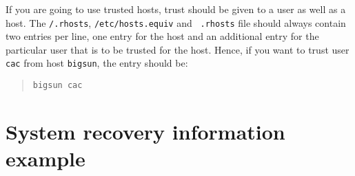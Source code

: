 \documentclass[11pt]{article}
\newcommand{\xlabel}[1]{}
\begin{document}
If you are going to use trusted hosts, trust should be given to a user
as well as a host. The {\tt /.rhosts}, {\tt /etc/hosts.equiv} and {\tt
.rhosts} file should always contain two entries per line, one entry for
the host and an additional entry for the particular user that is to be
trusted for the host. Hence, if you want to trust user {\tt cac} from
host {\tt bigsun}, the entry should be:

\begin{quote}{\tt bigsun cac} \end{quote}


\newpage
\appendix

\section{\label{system_recovery}\xlabel{system_recovery}System recovery information example}
\end{document}
